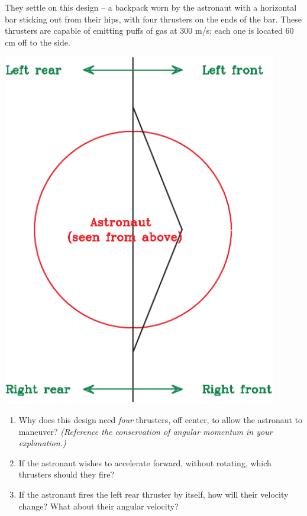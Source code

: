 \documentclass[12pt]{article}
\begin{document}
\begin{enumerate}
\begin{minipage}{0.6\textwidth}
\bigskip

		They settle on this design -- a backpack worn by the astronaut with a horizontal bar sticking out from their hips, with four thrusters on the ends of the bar. These thrusters are capable of emitting puffs
		of gas at 300 m/s; each one is located 60 cm off to the side.
		\end{minipage}
		\begin{minipage}{0.3\textwidth}
			\includegraphics[width=0.9\textwidth]{jetpack-crop.pdf}
		\end{minipage}
		\begin{enumerate}
			\item Why does this design need {\it four} thrusters, off center, to allow the astronaut to maneuver? {\it (Reference the conservation of angular momentum in your explanation.)}
			
			\vspace{0.5in}
			
			\item If the astronaut wishes to accelerate forward, without rotating, which thrusters should they fire?
			
						\vspace{0.5in}
			\item If the astronaut fires the left rear thruster by itself, how will their velocity change? What about their angular velocity?
			

\end{enumerate}
\end{enumerate}
\end{document}
